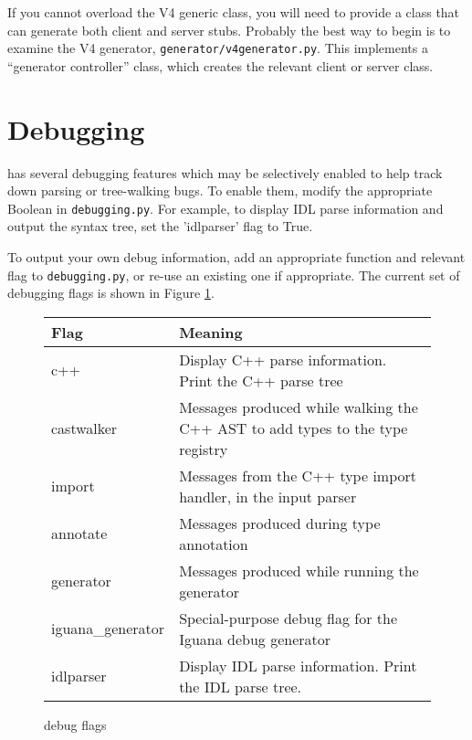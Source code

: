 If you cannot overload the V4 generic class, you will need to provide a class that can generate both client and server stubs. Probably the best way to begin is to examine the V4 generator, {\tt generator/v4generator.py}. This implements a ``generator controller'' class, which creates the relevant client or server class.

\section{Debugging}
\magpie has several debugging features which may be selectively enabled to help track down parsing or tree-walking bugs. To enable them, modify the appropriate Boolean in {\tt debugging.py}. For example, to display IDL parse information and output the syntax tree, set the 'idlparser' flag to True.

To output your own debug information, add an appropriate function and relevant flag to {\tt debugging.py}, or re-use an existing one if appropriate. The current set of debugging flags is shown in Figure \ref{fig:table:debuggingflags}.

\begin{figure}
\begin{tabularx}{\textwidth}{lX}
\textbf{Flag}&\textbf{Meaning}\\
\hline
c++ &Display C++ parse information. Print the C++ parse tree\\
castwalker &Messages produced while walking the C++ AST to add types to the type registry\\
import &Messages from the C++ type import handler, in the input parser\\
annotate &Messages produced during type annotation\\
generator &Messages produced while running the generator\\
iguana\_generator &Special-purpose debug flag for the Iguana debug generator\\
idlparser &Display IDL parse information. Print the IDL parse tree.\\
\end{tabularx}
\caption{\magpie debug flags}
\label{fig:table:debuggingflags}
\end{figure}
